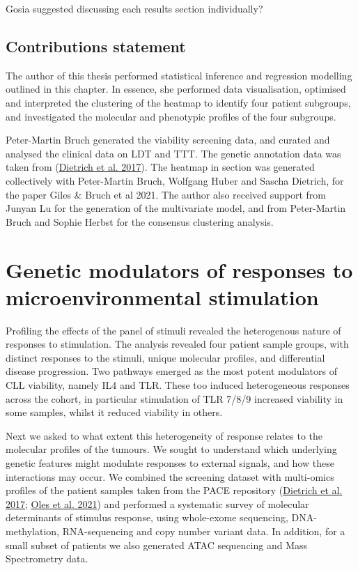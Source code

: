 \documentclass[11pt, a4paper, twosided]{book}
\begin{document}
Gosia suggested discussing each results section individually?

\hypertarget{contributions-statement}{%
\section{Contributions statement}\label{contributions-statement}}

The author of this thesis performed statistical inference and regression modelling outlined in this chapter. In essence, she performed data visualisation, optimised and interpreted the clustering of the heatmap to identify four patient subgroups, and investigated the molecular and phenotypic profiles of the four subgroups.

Peter-Martin Bruch generated the viability screening data, and curated and analysed the clinical data on LDT and TTT. The genetic annotation data was taken from (\protect\hyperlink{ref-JCIpaper}{Dietrich et al. 2017}). The heatmap in section was generated collectively with Peter-Martin Bruch, Wolfgang Huber and Sascha Dietrich, for the paper Giles \& Bruch et al 2021. The author also received support from Junyan Lu for the generation of the multivariate model, and from Peter-Martin Bruch and Sophie Herbst for the consensus clustering analysis.

\hypertarget{genetic-modulators-of-responses-to-microenvironmental-stimulation}{%
\chapter{Genetic modulators of responses to microenvironmental stimulation}\label{genetic-modulators-of-responses-to-microenvironmental-stimulation}}

Profiling the effects of the panel of stimuli revealed the heterogenous nature of responses to stimulation. The analysis revealed four patient sample groups, with distinct responses to the stimuli, unique molecular profiles, and differential disease progression. Two pathways emerged as the most potent modulators of CLL viability, namely IL4 and TLR. These too induced heterogeneous responses across the cohort, in particular stimulation of TLR 7/8/9 increased viability in some samples, whilst it reduced viability in others.

Next we asked to what extent this heterogeneity of response relates to the molecular profiles of the tumours. We sought to understand which underlying genetic features might modulate responses to external signals, and how these interactions may occur. We combined the screening dataset with multi-omics profiles of the patient samples taken from the PACE repository (\protect\hyperlink{ref-JCIpaper}{Dietrich et al. 2017}; \protect\hyperlink{ref-R-BloodCancerMultiOmics2017}{Oles et al. 2021}) and performed a systematic survey of molecular determinants of stimulus response, using whole-exome sequencing, DNA-methylation, RNA-sequencing and copy number variant data. In addition, for a small subset of patients we also generated ATAC sequencing and Mass Spectrometry data.
\end{document}
